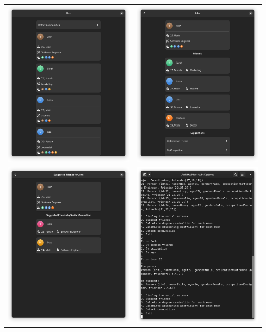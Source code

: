 \documentclass[11pt, twocolumn]{article}
\begin{document}
\begin{tabular}{cc}
    \includegraphics[width=.45\textwidth]{gui00} &
    \includegraphics[width=.45\textwidth]{gui1}
     \\
     \includegraphics[width=.45\textwidth]{gui2} &
     \includegraphics[width=.45\textwidth]{tui}
\end{tabular}
\end{document}
